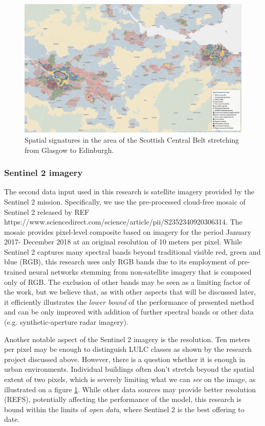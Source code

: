 \begin{figure}
    \centering
    \includegraphics[width=.8\linewidth]{fig/signatures_scotland.png}
    \caption{Spatial signatures in the area of the Scottish Central Belt stretching from Glasgow to Edinburgh.}
    \label{fig:signatures}
\end{figure}



\subsubsection{Sentinel 2 imagery}


The second data input used in this research is satellite imagery provided by the
Sentinel 2 mission. Specifically, we use the pre-processed cloud-free mosaic of Sentinel
2 released by {REF https://www.sciencedirect.com/science/article/pii/S2352340920306314}.
The mosaic provides pixel-level composite based on imagery for the period January 2017-
December 2018 at an original resolution of 10 meters per pixel. While Sentinel 2
captures many spectral bands beyond traditional visible red, green and blue (RGB),  this
research uses only RGB bands due to its employment of pre-trained neural networks
stemming from non-satellite imagery that is composed only of RGB. The exclusion of other
bands may be seen as a limiting factor of the work, but we believe that, as with other
aspects that will be discussed later, it efficiently illustrates the \textit{lower
bound} of the performance of presented method and can be only improved with addition of
further spectral bands or other data (e.g. synthetic-aperture radar imagery).

Another notable aspect of the Sentinel 2 imagery is the resolution. Ten meters per pixel
may be enough to distinguish LULC classes as shown by the research project discussed
above. However, there is a question whether it is enough in urban environments.
Individual buildings often don't stretch beyond the spatial extent of two pixels, which
is severely limiting what we can \textit{see} on the image, as illustrated on a figure
\ref{fig:signatures}. While other data sources may provide better resolution (REFS),
potentially affecting the performance of the model, this research is bound within the
limits of \textit{open data}, where Sentinel 2 is the best offering to date.



